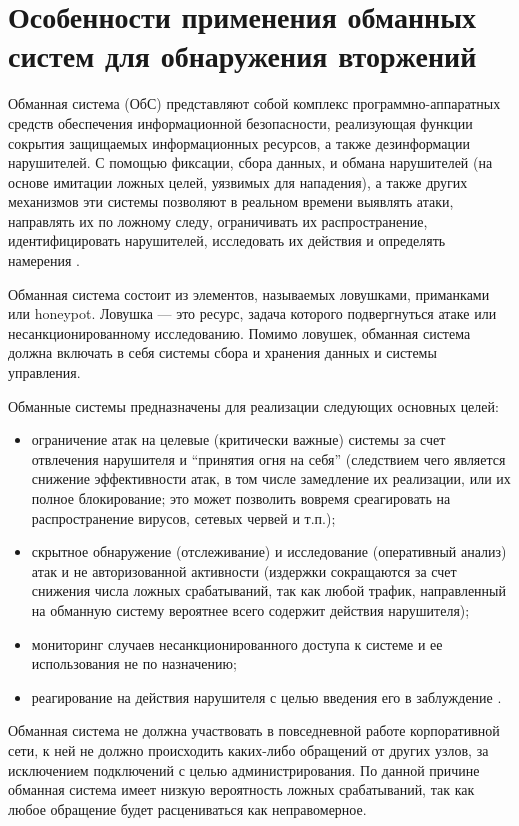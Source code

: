 \section{Особенности применения обманных систем для обнаружения вторжений}

Обманная система (ОбС) представляют собой комплекс программно-аппаратных средств обеспечения информационной безопасности, реализующая функции сокрытия защищаемых информационных ресурсов, а также дезинформации нарушителей. С помощью фиксации, сбора данных, и обмана нарушителей (на основе имитации ложных целей, уязвимых для нападения), а также других механизмов эти системы позволяют в реальном времени выявлять атаки, направлять их по ложному следу, ограничивать их распространение, идентифицировать нарушителей, исследовать их действия и определять намерения \citep{Kotenko2014}.

Обманная система состоит из элементов, называемых ловушками, приманками или honeypot. Ловушка — это ресурс, задача которого подвергнуться атаке или несанкционированному исследованию. Помимо ловушек, обманная система должна включать в себя системы сбора и хранения данных и системы управления. 

Обманные системы предназначены для реализации следующих основных целей:
\begin{itemize}
\item ограничение атак на целевые (критически важные) системы за счет отвлечения нарушителя и “принятия огня на себя” (следствием чего является снижение эффективности атак, в том числе замедление их реализации, или их полное блокирование; это может позволить вовремя среагировать на распространение вирусов, сетевых червей и т.п.);
\item скрытное обнаружение (отслеживание) и исследование (оперативный анализ) атак и не авторизованной активности (издержки сокращаются за счет снижения числа ложных срабатываний, так как любой трафик, направленный на обманную систему вероятнее всего содержит действия нарушителя); 
\item мониторинг случаев несанкционированного доступа к системе и ее использования не по назначению;
\item реагирование на действия нарушителя с целью введения его в заблуждение \citep{Kotenko2014} \citep{Hernacki2004}.
\end{itemize}

Обманная система не должна участвовать в повседневной работе корпоративной сети, к ней не должно происходить каких-либо обращений от других узлов, за исключением подключений с целью администрирования. По данной причине обманная система имеет низкую вероятность ложных срабатываний, так как любое обращение будет расцениваться как неправомерное.

